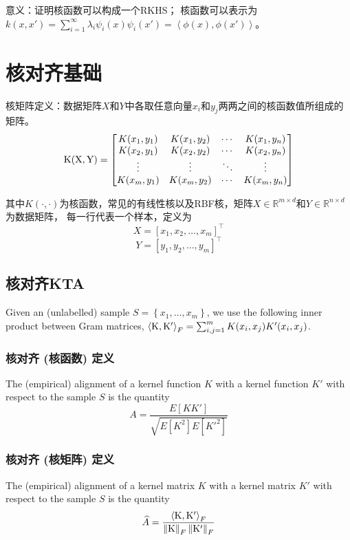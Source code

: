 \documentclass{ctexart}
\begin{document}
    意义：证明核函数可以构成一个RKHS；
    核函数可以表示为$k(x, x') = \sum_{i=1}^{\infty}\lambda_{i}\psi_{i}(x)\psi_{i}(x')=\left<\phi(x), \phi(x')\right>$。

    \section{核对齐基础}
    核矩阵定义：数据矩阵$X$和$Y$中各取任意向量$x_i$和$y_j$两两之间的核函数值所组成的矩阵。
    \begin{equation}
    {\rm K(X, Y)} = 
    \begin{bmatrix}
        K(x_1, y_1) & K(x_1, y_2) & \cdots & K(x_1, y_n) \\
        K(x_2, y_1) & K(x_2, y_2) & \cdots & K(x_2, y_n) \\
        \vdots      & \vdots      & \ddots & \vdots      \\
        K(x_m, y_1) & K(x_m, y_2) & \cdots & K(x_m, y_n) \\
    \end{bmatrix}
    \end{equation}

    其中$K(\cdot,\cdot)$为核函数，常见的有线性核以及RBF核，矩阵$X\in\mathbb{R}^{m\times d}$和$Y\in\mathbb{R}^{n\times d}$为数据矩阵，
    每一行代表一个样本，定义为
    \[X = [x_1, x_2, \dots, x_m]^{\top}\]
    \[Y = [y_1, y_2, \dots, y_m]^{\top}\]

    \subsection{核对齐KTA}
    Given an (unlabelled) sample $S=\left\{x_1, \dots, x_m\right\}$, we use the following inner product between Gram matrices, 
    $\left\langle {\rm K}, {\rm K'}\right\rangle_F = \sum_{i,j=1}^{m}K(x_i, x_j)K'(x_i, x_j)$.

    
    \subsubsection{核对齐 (核函数) 定义}
    The (empirical) alignment of a kernel function $K$ with a kernel function $K'$ with respect to the sample $S$ is the quantity
    \begin{equation}
        A = \frac{E[KK']}{\sqrt{E[K^2]E[K'^2]}}
    \end{equation}
    
    \subsubsection{核对齐 (核矩阵) 定义}
    The (empirical) alignment of a kernel matrix $K$ with a kernel matrix $K'$ with respect to the sample $S$ is the quantity 
    \begin{equation}
        \widehat{A} = \frac{\left\langle {\rm K}, {\rm K'}\right\rangle_F}{\left\lVert {\rm K}\right\rVert_F \left\lVert {\rm K'}\right\rVert_F} 
    \end{equation}
\end{document}
